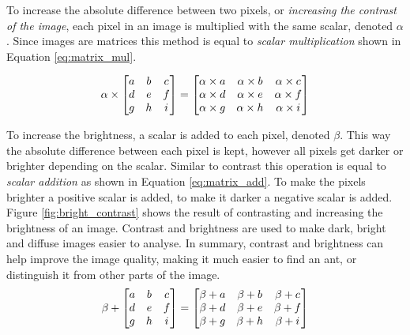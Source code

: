 To increase the absolute difference between two pixels, or \textit{increasing the contrast of the image}, each pixel in an image is multiplied with the same scalar, denoted $\alpha$. Since images are matrices this method is equal to \textit{scalar multiplication} shown in Equation \ref{eq:matrix_mul}.

\begin{equation}
\alpha \times 
\setlength{\arraycolsep}{5pt}
 \begin{bmatrix}
  a & b & c \\
  d & e & f \\
  g & h & i \\
 \end{bmatrix} =
 \setlength{\arraycolsep}{5pt} 
 \begin{bmatrix}
  \alpha \times a & \alpha \times b & \alpha \times c \\
  \alpha \times d & \alpha \times e & \alpha \times f \\
  \alpha \times g & \alpha \times h & \alpha \times i \\
 \end{bmatrix}
 \label{eq:matrix_mul}
\end{equation}

To increase the brightness, a scalar is added to each pixel, denoted $\beta$. This way the absolute difference between each pixel is kept, however all pixels get darker or brighter depending on the scalar. Similar to contrast this operation is equal to \textit{scalar addition} as shown in Equation \ref{eq:matrix_add}. To make the pixels brighter a positive scalar is added, to make it darker a negative scalar is added. Figure \ref{fig:bright_contrast} shows the result of contrasting and increasing the brightness of an image. Contrast and brightness are used to make dark, bright and diffuse images easier to analyse. In summary, contrast and brightness can help improve the image quality, making it much easier to find an ant, or distinguish it from other parts of the image.\\

\begin{equation}
\beta + 
\setlength{\arraycolsep}{5pt}
 \begin{bmatrix}
  a & b & c \\
  d & e & f \\
  g & h & i \\
 \end{bmatrix} =
 \setlength{\arraycolsep}{5pt} 
 \begin{bmatrix}
  \beta + a & \beta + b & \beta + c \\
  \beta + d & \beta + e & \beta + f \\
  \beta + g & \beta + h & \beta + i \\
 \end{bmatrix}
 \label{eq:matrix_add}
\end{equation}

